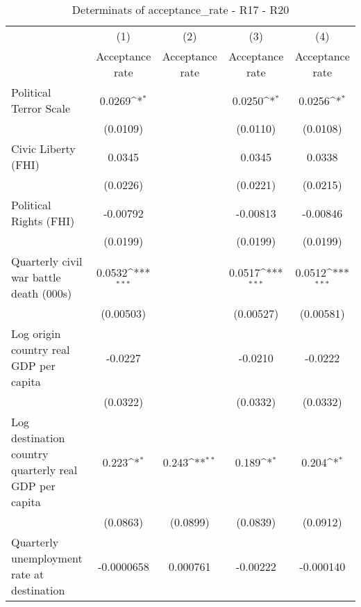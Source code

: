 \begin{table}[htbp]\centering
\def\sym#1{\ifmmode^{#1}\else\(^{#1}\)\fi}
\caption{Determinats of acceptance\_rate - R17 - R20}
\begin{tabular}{l*{4}{c}}
\hline\hline
                    &\multicolumn{1}{c}{(1)}&\multicolumn{1}{c}{(2)}&\multicolumn{1}{c}{(3)}&\multicolumn{1}{c}{(4)}\\
                    &\multicolumn{1}{c}{Acceptance rate}&\multicolumn{1}{c}{Acceptance rate}&\multicolumn{1}{c}{Acceptance rate}&\multicolumn{1}{c}{Acceptance rate}\\
\hline
Political Terror Scale&      0.0269\sym{*}  &                     &      0.0250\sym{*}  &      0.0256\sym{*}  \\
                    &    (0.0109)         &                     &    (0.0110)         &    (0.0108)         \\
[1em]
Civic Liberty (FHI) &      0.0345         &                     &      0.0345         &      0.0338         \\
                    &    (0.0226)         &                     &    (0.0221)         &    (0.0215)         \\
[1em]
Political Rights (FHI)&    -0.00792         &                     &    -0.00813         &    -0.00846         \\
                    &    (0.0199)         &                     &    (0.0199)         &    (0.0199)         \\
[1em]
Quarterly civil war battle death (000s)&      0.0532\sym{***}&                     &      0.0517\sym{***}&      0.0512\sym{***}\\
                    &   (0.00503)         &                     &   (0.00527)         &   (0.00581)         \\
[1em]
Log origin country real GDP per capita&     -0.0227         &                     &     -0.0210         &     -0.0222         \\
                    &    (0.0322)         &                     &    (0.0332)         &    (0.0332)         \\
[1em]
Log destination country quarterly real GDP per capita&       0.223\sym{*}  &       0.243\sym{**} &       0.189\sym{*}  &       0.204\sym{*}  \\
                    &    (0.0863)         &    (0.0899)         &    (0.0839)         &    (0.0912)         \\
[1em]
Quarterly unemployment rate at destination&  -0.0000658         &    0.000761         &    -0.00222         &   -0.000140         \\

\end{tabular}
\end{table}
